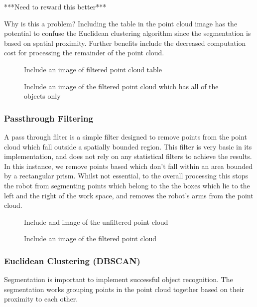 \documentclass[a4paper]{article}
\begin{document}
***Need to reward this better***

Why is this a problem? Including the table in the point cloud image has the potential to confuse the Euclidean clustering algorithm since the segmentation is based on spatial proximity. Further benefits include the decreased computation cost for processing the remainder of the point cloud.

\begin{figure}
\begin{minipage}{0.45\linewidth}
\centering
\caption{Include an image of filtered point cloud table}
\end{minipage}
\begin{minipage}{0.45\linewidth}
\centering
\caption{Include an image of the filtered point cloud which has all of the objects only}
\end{minipage}
\end{figure}

\subsubsection{Passthrough Filtering}
A pass through filter is a simple filter designed to remove points from the point cloud which fall outside a spatially bounded region. This filter is very basic in its implementation, and does not rely on any statistical filters to achieve the results. In this instance, we remove points based which don't fall within an area bounded by a rectangular prism. Whilst not essential, to the overall processing this stops the robot from segmenting points which belong to the the boxes which lie to the left and the right of the work space, and removes the robot's arms from the point cloud.

\begin{figure}
\begin{minipage}{0.45\linewidth}
\centering
\caption{Include and image of the unfiltered point cloud}
\end{minipage}
\begin{minipage}{0.45\linewidth}
\centering
\caption{Include an image of the filtered point cloud}
\end{minipage}
\end{figure}

\subsubsection{Euclidean Clustering (DBSCAN)}
Segmentation is important to implement successful object recognition. The segmentation works grouping points in the point cloud together based on their proximity to each other.
\end{document}
